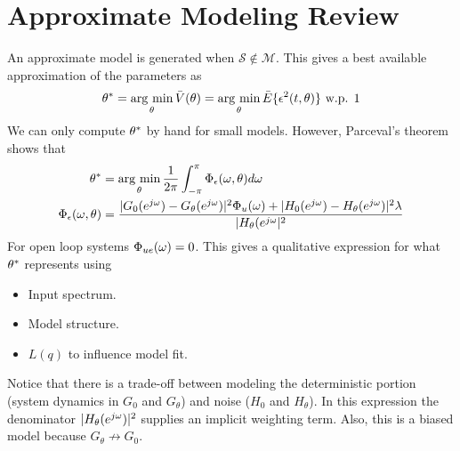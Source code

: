 
\mainmatter
\setcounter{page}{1}

\lectureseries[\course]{\course}

\date{November 24, 2009}

\setaddress

\setcounter{lecture}{16}
\setcounter{chapter}{16}


\section{Approximate Modeling Review}
An approximate model is generated when $\mathcal{S}\notin\mathcal{M}$. This gives a best available approximation of the parameters as
$$\theta^\ast = \mathop{\arg\,\min}\limits_\theta \bar{V}(\theta) = \mathop{\arg\,\min}\limits_\theta\bar{E}\{\epsilon^2(t,\theta)\} \text{ w.p. } 1$$
We can only compute $\theta^\ast$ by hand for small models. However, Parceval's theorem shows that
\begin{align*}
\theta^\ast &= \mathop{\arg\,\min}\limits_\theta \frac{1}{2\pi}\int_{-\pi}^\pi \Phi_\epsilon(\omega,\theta)d\omega \\
\Phi_\epsilon(\omega,\theta) &= \frac{|G_0(e^{j\omega})-G_\theta(e^{j\omega})|^2\Phi_u(\omega) + |H_0(e^{j\omega})-H_\theta(e^{j\omega})|^2\lambda}{|H_\theta(e^{j\omega}|^2}
\end{align*}
For open loop systems $\Phi_{ue}(\omega) = 0$. This gives a qualitative expression for what $\theta^\ast$ represents using
\begin{itemize}
\item Input spectrum.
\item Model structure.
\item $L(q)$ to influence model fit.
\end{itemize}
Notice that there is a trade-off between modeling the deterministic portion (system dynamics in $G_0$ and $G_\theta$) and noise ($H_0$ and $H_\theta$). In this expression the denominator $|H_\theta(e^{j\omega})|^2$ supplies an implicit weighting term. Also, this is a biased model because $G_\theta\not\to G_0$.

